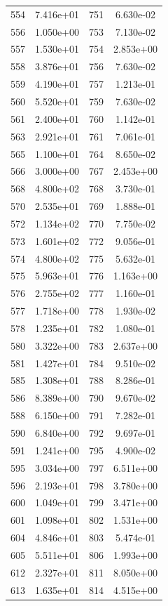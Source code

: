 \documentclass[12pt]{article}
\begin{document}
\begin{longtable}{@{}cccc@{}}
554 & 7.416e+01 & 751 & 6.630e-02 \\
556 & 1.050e+00 & 753 & 7.130e-02 \\
557 & 1.530e+01 & 754 & 2.853e+00 \\
558 & 3.876e+01 & 756 & 7.630e-02 \\
559 & 4.190e+01 & 757 & 1.213e-01 \\
560 & 5.520e+01 & 759 & 7.630e-02 \\
561 & 2.400e+01 & 760 & 1.142e-01 \\
563 & 2.921e+01 & 761 & 7.061e-01 \\
565 & 1.100e+01 & 764 & 8.650e-02 \\
566 & 3.000e+00 & 767 & 2.453e+00 \\
568 & 4.800e+02 & 768 & 3.730e-01 \\
570 & 2.535e+01 & 769 & 1.888e-01 \\
572 & 1.134e+02 & 770 & 7.750e-02 \\
573 & 1.601e+02 & 772 & 9.056e-01 \\
574 & 4.800e+02 & 775 & 5.632e-01 \\
575 & 5.963e+01 & 776 & 1.163e+00 \\
576 & 2.755e+02 & 777 & 1.160e-01 \\
577 & 1.718e+00 & 778 & 1.930e-02 \\
578 & 1.235e+01 & 782 & 1.080e-01 \\
580 & 3.322e+00 & 783 & 2.637e+00 \\
581 & 1.427e+01 & 784 & 9.510e-02 \\
585 & 1.308e+01 & 788 & 8.286e-01 \\
586 & 8.389e+00 & 790 & 9.670e-02 \\
588 & 6.150e+00 & 791 & 7.282e-01 \\
590 & 6.840e+00 & 792 & 9.697e-01 \\
591 & 1.241e+00 & 795 & 4.900e-02 \\
595 & 3.034e+00 & 797 & 6.511e+00 \\
596 & 2.193e+01 & 798 & 3.780e+00 \\
600 & 1.049e+01 & 799 & 3.471e+00 \\
601 & 1.098e+01 & 802 & 1.531e+00 \\
604 & 4.846e+01 & 803 & 5.474e-01 \\
605 & 5.511e+01 & 806 & 1.993e+00 \\
612 & 2.327e+01 & 811 & 8.050e+00 \\
613 & 1.635e+01 & 814 & 4.515e+00 \\

\end{longtable}
\end{document}
